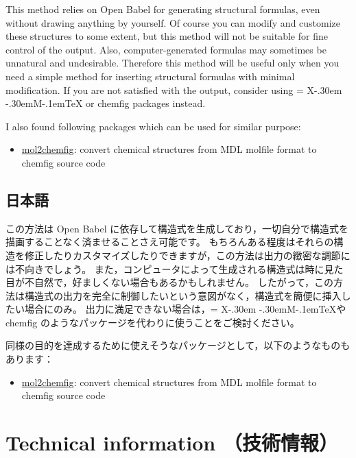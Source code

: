 \documentclass[12pt]{jsarticle}
\def\XyM{\ifnum\fam=-1\relax\fam=0\relax\fi\TestCount=\fam%
X\kern-.30em\smash{\raise.50ex\hbox{$\fam\TestCount\Upsilon$}}%
\kern-.30em{M}}
\def\XyMTeX{\XyM\kern-.1em\TeX}
\begin{document}
This method relies on Open Babel for generating structural formulas, even without drawing anything by yourself.
Of course you can modify and customize these structures to some extent, but this method will not be suitable for fine control of the output.
Also, computer-generated formulas may sometimes be unnatural and undesirable.
Therefore this method will be useful only when you need a simple method for inserting structural formulas with minimal modification.
If you are not satisfied with the output, consider using {\XyMTeX} or \textsf{chemfig} packages instead.

I also found following packages which can be used for similar purpose:
\begin{itemize}
\item \href{http://www.ctan.org/pkg/mol2chemfig}{\textsf{mol2chemfig}}: convert chemical structures from MDL molfile format to \textsf{chemfig} source code
\end{itemize}

\subsection{日本語}

この方法は Open Babel に依存して構造式を生成しており，一切自分で構造式を描画することなく済ませることさえ可能です。
もちろんある程度はそれらの構造を修正したりカスタマイズしたりできますが，この方法は出力の緻密な調節には不向きでしょう。
また，コンピュータによって生成される構造式は時に見た目が不自然で，好ましくない場合もあるかもしれません。
したがって，この方法は構造式の出力を完全に制御したいという意図がなく，構造式を簡便に挿入したい場合にのみ。
出力に満足できない場合は，\XyMTeX や \textsf{chemfig} のようなパッケージを代わりに使うことをご検討ください。

同様の目的を達成するために使えそうなパッケージとして，以下のようなものもあります：
\begin{itemize}
\item \href{http://www.ctan.org/pkg/mol2chemfig}{\textsf{mol2chemfig}}: convert chemical structures from MDL molfile format to \textsf{chemfig} source code
\end{itemize}

\clearpage

\section{Technical information （技術情報）} \label{detail}
\end{document}
